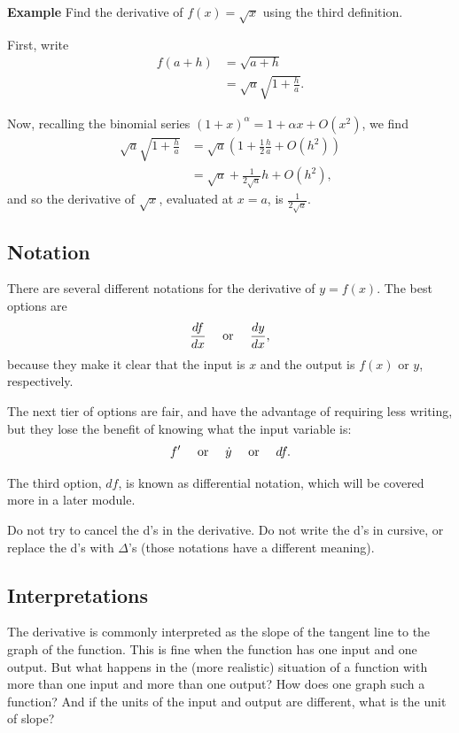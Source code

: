 \documentclass[twoside,openright,titlepage,a4paper]{book}
\begin{document}
\begin{sloppypar}
\textbf{Example} Find the derivative of $f(x) = \sqrt{x}$ using the third definition. 
\begin{examplebox}
First, write
\begin{align*} 
f(a+h) &= \sqrt{a+h} \\
&= \sqrt{a} \sqrt{1 + \frac{h}{a}}. 
\end{align*}

Now, recalling the binomial series $(1+x)^\alpha = 1 + \alpha x + O(x^2)$, we find
\begin{align*}
\sqrt{a} \sqrt{1 + \frac{h}{a}} &= \sqrt{a} \left(1 + \frac{1}{2}\frac{h}{a} + O(h^2)\right) \\
&= \sqrt{a} + \frac{1}{2\sqrt{a}} h + O(h^2),
\end{align*}
and so the derivative of $\sqrt{x}$, evaluated at $x=a$, is $\frac{1}{2 \sqrt{a}}$.
\end{examplebox}

\subsection{Notation}
There are several different notations for the derivative of $y=f(x)$. The best options are \[ \frac{df}{dx} \quad \hbox{ or } \quad \frac{dy}{dx}, \] because they make it clear that the input is $x$ and the output is $f(x)$ or $y$, respectively.

The next tier of options are fair, and have the advantage of requiring less writing, but they lose the benefit of knowing what the input variable is:
\[ f' \quad \hbox{ or } \quad \dot{y} \quad \hbox{ or } \quad df. \]

The third option, $df$, is known as differential notation, which will be covered more in a later module.

Do not try to cancel the d's in the derivative. Do not write the d's in cursive, or replace the d's with $\Delta$'s (those notations have a different meaning).

\subsection{Interpretations}
The derivative is commonly interpreted as the slope of the tangent line to the graph of the function. This is fine when the function has one input and one output. But what happens in the (more realistic) situation of a function with more than one input and more than one output? How does one graph such a function? And if the units of the input and output are different, what is the unit of slope?


\end{sloppypar}
\end{document}
